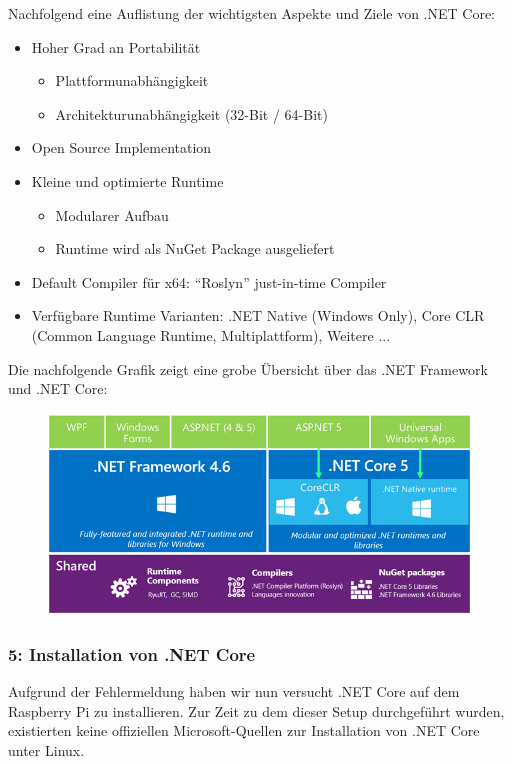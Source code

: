 Nachfolgend eine Auflistung der wichtigsten Aspekte und Ziele von .NET Core:
\begin{itemize}
\item Hoher Grad an Portabilität
\begin{itemize}
\item Plattformunabhängigkeit
\item Architekturunabhängigkeit (32-Bit / 64-Bit)
\end{itemize}
\item Open Source Implementation
\item Kleine und optimierte Runtime
\begin{itemize}
\item Modularer Aufbau
\item Runtime wird als NuGet Package ausgeliefert
\end{itemize}
\item Default Compiler für x64: "`Roslyn"' just-in-time Compiler
\item Verfügbare Runtime Varianten: .NET Native (Windows Only), Core CLR (Common Language Runtime, Multiplattform), Weitere ...
\end{itemize}

Die nachfolgende Grafik zeigt eine grobe Übersicht über das .NET Framework und .NET Core:
\begin{figure}[H]
  \centering
  \includegraphics[width=15cm]{./images/UnderstandingNetCore}
\end{figure}


\subsubsection{5: Installation von .NET Core}
Aufgrund der Fehlermeldung haben wir nun versucht .NET Core auf dem Raspberry Pi zu installieren. Zur Zeit zu dem dieser Setup durchgeführt wurden, existierten keine offiziellen Microsoft-Quellen zur Installation von .NET Core unter Linux.

